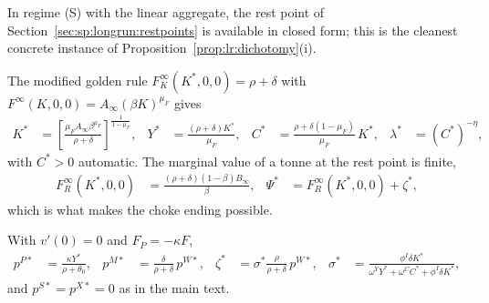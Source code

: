 In regime (S) with the linear aggregate, the rest point of Section~\ref{sec:sp:longrun:restpoints} is available in closed form; this is the cleanest concrete instance of Proposition~\ref{prop:lr:dichotomy}(i).

 The modified golden rule $F^\infty_K\left(K^*,0,0\right)=\rho+\delta$ with $F^\infty\left(K,0,0\right)=A_\infty\left(\beta K\right)^{\mu_F}$ gives
\begin{align}
K^* &= \left[\frac{\mu_F A_\infty\beta^{\mu_F}}{\rho+\delta}\right]^{\frac{1}{1-\mu_F}},
&
Y^* &= \frac{\left(\rho+\delta\right)K^*}{\mu_F},
&
C^* &= \frac{\rho+\delta\left(1-\mu_F\right)}{\mu_F}\,K^*,
&
\lambda^* &= \left(C^*\right)^{-\eta},
\label{eq:app:wh:mgr}
\end{align}
with $C^*>0$ automatic. The marginal value of a tonne at the rest point is finite,
\begin{align}
F^\infty_R\left(K^*,0,0\right) &= \frac{\left(\rho+\delta\right)\left(1-\beta\right)B_\infty}{\beta},
&
\Psi^* &= F^\infty_R\left(K^*,0,0\right)+\zeta^*,
\label{eq:app:wh:FRstar}
\end{align}
which is what makes the choke ending possible.

 With $v'\left(0\right)=0$ and $F_P=-\kappa F$,
\begin{align}
p^{P*} &= \frac{\kappa Y^*}{\rho+\theta_0},
&
p^{M*} &= \frac{\delta}{\rho+\delta}\,p^{W*},
&
\zeta^* &= \sigma^*\frac{\rho}{\rho+\delta}\,p^{W*},
&
\sigma^* &= \frac{\phi^I\delta K^*}{\omega^YY^*+\omega^CC^*+\phi^I\delta K^*},
\label{eq:app:wh:restprices}
\end{align}
and $p^{S*}=p^{X*}=0$ as in the main text.

